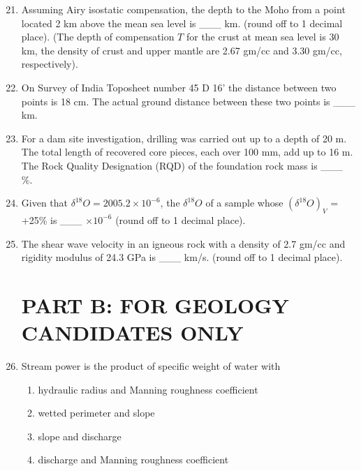 \documentclass[journal,12pt,onecolumn]{IEEEtran}
\theoremstyle{remark}
\begin{document}
\begin{enumerate}
\setcounter{enumi}{20}

\item Assuming Airy isostatic compensation, the depth to the Moho from a point located 2 km above the mean sea level is \_\_\_ km. (round off to 1 decimal place).  
(The depth of compensation $T$ for the crust at mean sea level is 30 km, the density of crust and upper mantle are 2.67 gm/cc and 3.30 gm/cc, respectively).
\vspace{0.5cm}

\item On Survey of India Toposheet number 45 D 16' the distance between two points is 18 cm.  
The actual ground distance between these two points is \_\_\_ km.
\vspace{0.5cm}
\item For a dam site investigation, drilling was carried out up to a depth of 20 m.  
The total length of recovered core pieces, each over 100 mm, add up to 16 m.  
The Rock Quality Designation (RQD) of the foundation rock mass is \_\_\_ \%.
\vspace{0.5cm}

\item Given that $\delta^{18}O = 2005.2 \times 10^{-6}$, the $\delta^{18}O$ of a sample whose $(\delta^{18}O)_V$ = +25\% is \_\_\_ $\times 10^{-6}$ (round off to 1 decimal place).
\vspace{0.5cm}

\item The shear wave velocity in an igneous rock with a density of 2.7 gm/cc and rigidity modulus of 24.3 GPa is \_\_\_ km/s. (round off to 1 decimal place).
\vspace{0.5cm}


\section{PART B: FOR GEOLOGY CANDIDATES ONLY}
\vspace{0.5cm}



\item Stream power is the product of specific weight of water with  
\begin{enumerate}
\item hydraulic radius and Manning roughness coefficient
\item wetted perimeter and slope
\item slope and discharge
\item discharge and Manning roughness coefficient
\end{enumerate}


\end{enumerate}
\end{document}
